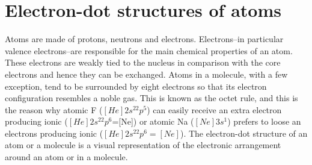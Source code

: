 \documentclass[main.tex]{subfiles}
\begin{document}
\section{Electron-dot structures of atoms}
Atoms are made of protons, neutrons and electrons. Electrons--in particular valence electrons--are responsible for the main chemical properties of an atom. These electrons are weakly tied to the nucleus in comparison with the core electrons and hence they can be exchanged. Atoms in a molecule, with a few exception, tend to be surrounded by eight electrons so that its electron configuration resembles a noble gas. This is known as the octet rule, and this is the reason why atomic F ($[He]2s^22p^5$) can easily receive an extra electron producing ionic  ($[He]2s^22p^6$=[Ne]) or atomic Na ($[Ne]3s^1$) prefers to loose an electrons producing ionic  ($[He]2s^22p^6=[Ne]$). The electron-dot structure of an atom or a molecule is a visual representation of the electronic arrangement around an atom or in a molecule. 
\sloppy 
	
	

	
	
\end{document}
